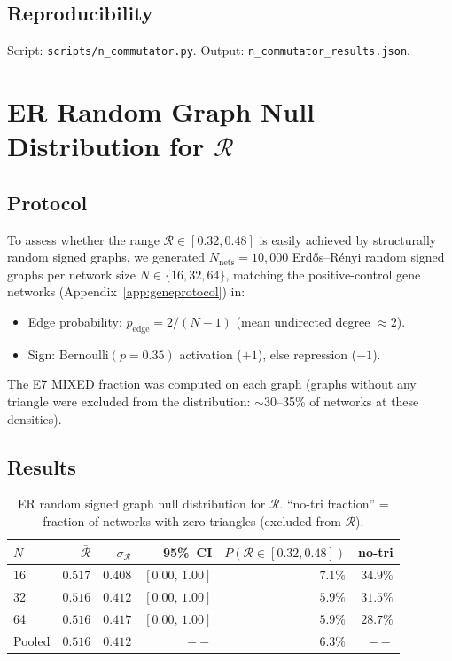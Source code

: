 \documentclass[12pt,a4paper]{article}
\newcommand{\R}{\mathcal{R}}           %
\theoremstyle{plain}
\theoremstyle{definition}
\theoremstyle{remark}
\begin{document}
\subsection*{Reproducibility}

Script: \texttt{scripts/n\_commutator.py}.
Output: \texttt{n\_commutator\_results.json}.

\section{ER Random Graph Null Distribution for $\R$}
\label{app:null_er}

\subsection*{Protocol}

To assess whether the range $\R\in[0.32,0.48]$ is easily achieved by structurally
random signed graphs, we generated $N_\text{nets}=10{,}000$ Erd{\H o}s--R{\'e}nyi
random signed graphs per network size $N\in\{16,32,64\}$, matching the
positive-control gene networks (Appendix~\ref{app:geneprotocol}) in:
\begin{itemize}
  \item Edge probability: $p_\text{edge}=2/(N-1)$ (mean undirected degree $\approx2$).
  \item Sign: Bernoulli$(p=0.35)$ activation ($+1$), else repression ($-1$).
\end{itemize}
The E7 MIXED fraction was computed on each graph (graphs without any triangle
were excluded from the distribution: $\sim$30--35\% of networks at these densities).

\subsection*{Results}

\begin{table}[H]
\centering
\caption{ER random signed graph null distribution for $\R$.
  ``no-tri fraction'' = fraction of networks with zero triangles (excluded from $\R$).}
\label{tab:er_null}
\small
\begin{tabular}{lrrrrr}
\toprule
$N$ & $\bar{\R}$ & $\sigma_\R$ & 95\%~CI & $P(\R\in[0.32,0.48])$ & no-tri \\
\midrule
16  & $0.517$ & $0.408$ & $[0.00,\,1.00]$ & $7.1\%$ & $34.9\%$ \\
32  & $0.516$ & $0.412$ & $[0.00,\,1.00]$ & $5.9\%$ & $31.5\%$ \\
64  & $0.516$ & $0.417$ & $[0.00,\,1.00]$ & $5.9\%$ & $28.7\%$ \\
Pooled & $0.516$ & $0.412$ & $--$ & $6.3\%$ & $--$ \\
\bottomrule
\end{tabular}
\end{table}
\end{document}
